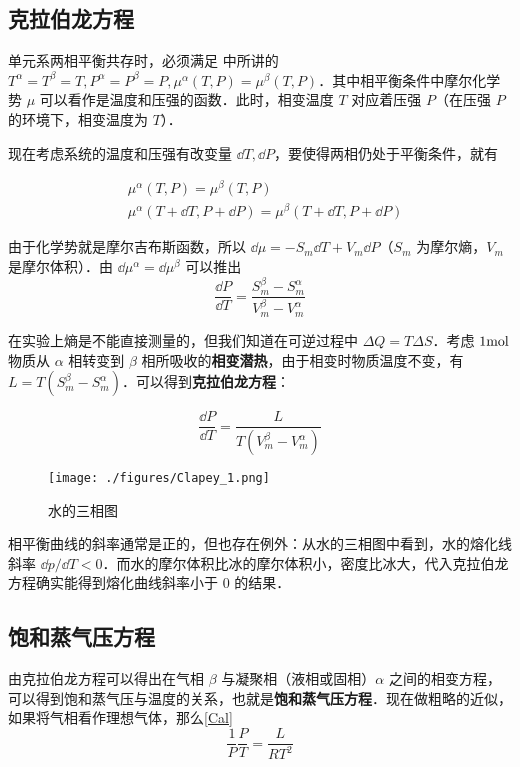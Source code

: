 
\begin{issues}
\issueDraft
\end{issues}


\subsection{克拉伯龙方程}
单元系两相平衡共存时，必须满足 中所讲的 $T^\alpha=T^\beta=T,P^\alpha=P^\beta=P,\mu^\alpha(T,P)=\mu^\beta(T,P)$．其中相平衡条件中摩尔化学势 $\mu$ 可以看作是温度和压强的函数．此时，相变温度 $T$ 对应着压强 $P$（在压强 $P$ 的环境下，相变温度为 $T$）．

现在考虑系统的温度和压强有改变量 $\dd T,\dd P$，要使得两相仍处于平衡条件，就有

\begin{align}
&\mu^\alpha(T,P)=\mu^\beta(T,P)\\
&\mu^\alpha(T+\dd T,P+\dd P)=\mu^\beta(T+\dd T,P+\dd P)
\end{align}

由于化学势就是摩尔吉布斯函数，所以 $\dd\mu=-S_m\dd T+V_m\dd P$（$S_m$ 为摩尔熵，$V_m$ 是摩尔体积）．由 $\dd \mu^\alpha=\dd \mu^\beta$ 可以推出
\begin{equation}
\frac{\dd P}{\dd T}=\frac{S^\beta_m-S^\alpha_m}{V^\beta_m-V^\alpha_m}
\end{equation}

在实验上熵是不能直接测量的，但我们知道在可逆过程中 $\Delta Q=T\Delta S$．考虑 $1\rm mol$ 物质从 $\alpha$ 相转变到 $\beta$ 相所吸收的\textbf{相变潜热}，由于相变时物质温度不变，有 $L=T(S_m^\beta-S_m^\alpha)$．可以得到\textbf{克拉伯龙方程}：

\begin{equation}\label{Clapey_eq1}
\frac{\dd P}{\dd T}=\frac{L}{T(V^\beta_m-V^\alpha_m)}
\end{equation}
\begin{figure}[ht]
\centering
\texttt{[image: ./figures/Clapey\_1.png]}
\caption{水的三相图} \label{Clapey_fig1}
\end{figure}

相平衡曲线的斜率通常是正的，但也存在例外：从水的三相图中看到，水的熔化线斜率 $\dd p/\dd T<0$．而水的摩尔体积比冰的摩尔体积小，密度比冰大，代入克拉伯龙方程确实能得到熔化曲线斜率小于 $0$ 的结果．

\subsection{饱和蒸气压方程}

由克拉伯龙方程可以得出在气相 $\beta$ 与凝聚相（液相或固相）$\alpha$ 之间的相变方程，可以得到饱和蒸气压与温度的关系，也就是\textbf{饱和蒸气压方程}．现在做粗略的近似，如果将气相看作理想气体，那么\autoref{Cal}
\begin{equation}
\frac{1}{P}\frac{P}{T}=\frac{L}{RT^2}
\end{equation}